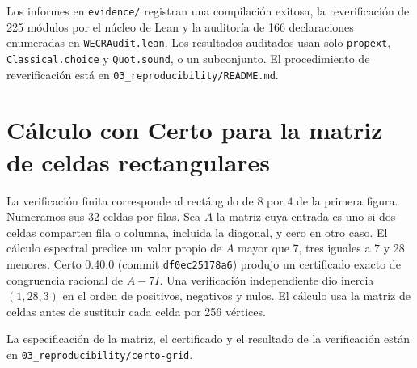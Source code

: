 \documentclass[11pt]{article}
\newcommand{\leanref}[1]{\texttt{#1.lean}}
\begin{document}
Los informes en \nolinkurl{evidence/} registran una compilación exitosa, la reverificación de 225 módulos por el núcleo de Lean y la auditoría de 166 declaraciones enumeradas en \leanref{WECRAudit}. Los resultados auditados usan solo \texttt{propext}, \texttt{Classical.choice} y \texttt{Quot.sound}, o un subconjunto. El procedimiento de reverificación está en \nolinkurl{03_reproducibility/README.md}.

\section*{Cálculo con Certo para la matriz de celdas rectangulares}

La verificación finita corresponde al rectángulo de \(8\) por \(4\) de la primera figura. Numeramos sus 32 celdas por filas. Sea \(A\) la matriz cuya entrada es uno si dos celdas comparten fila o columna, incluida la diagonal, y cero en otro caso. El cálculo espectral predice un valor propio de \(A\) mayor que \(7\), tres iguales a \(7\) y 28 menores. Certo 0.40.0 (commit \texttt{df0ec25178a6}) produjo un certificado exacto de congruencia racional de \(A-7I\). Una verificación independiente dio inercia \((1,28,3)\) en el orden de positivos, negativos y nulos. El cálculo usa la matriz de celdas antes de sustituir cada celda por 256 vértices.

La especificación de la matriz, el certificado y el resultado de la verificación están en \nolinkurl{03_reproducibility/certo-grid}.
\end{document}
